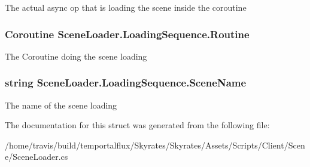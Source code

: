 The actual async op that is loading the scene inside the coroutine 

\hypertarget{struct_scene_loader_1_1_loading_sequence_a346ec7dcd6ae9036c62c38fc987dc43d}{
\subsubsection[{Routine}]{\setlength{\rightskip}{0pt plus 5cm}Coroutine Scene\-Loader.\-Loading\-Sequence.\-Routine}}\label{struct_scene_loader_1_1_loading_sequence_a346ec7dcd6ae9036c62c38fc987dc43d}


The Coroutine doing the scene loading 

\hypertarget{struct_scene_loader_1_1_loading_sequence_ac6ab54600d13969b5c4a9a336f61f5a9}{
\subsubsection[{Scene\-Name}]{\setlength{\rightskip}{0pt plus 5cm}string Scene\-Loader.\-Loading\-Sequence.\-Scene\-Name}}\label{struct_scene_loader_1_1_loading_sequence_ac6ab54600d13969b5c4a9a336f61f5a9}


The name of the scene loading 



The documentation for this struct was generated from the following file\-:\begin{DoxyCompactItemize}
\item 
/home/travis/build/temportalflux/\-Skyrates/\-Skyrates/\-Assets/\-Scripts/\-Client/\-Scene/Scene\-Loader.\-cs\end{DoxyCompactItemize}
